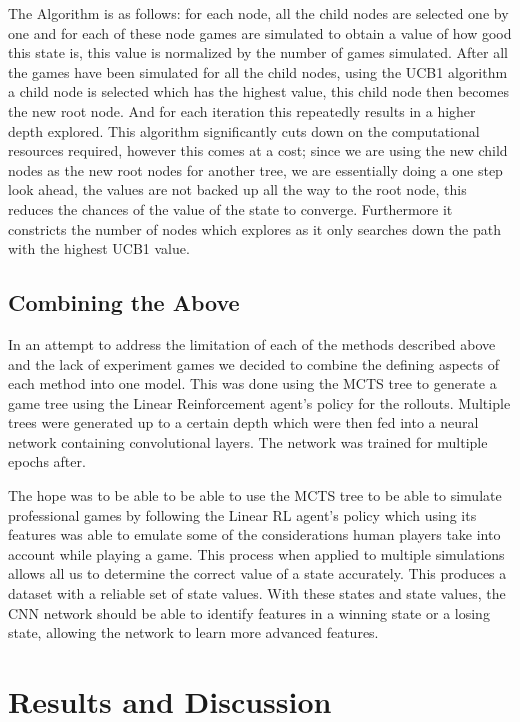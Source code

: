 \documentclass[a4paper,12pt,table]{article}
\begin{document}
The Algorithm is as follows: for each node, all the child nodes are selected one by one and for each of these node games are simulated to obtain a value of how good this state is, this value is normalized by the number of games simulated. After all the games have been simulated for all the child nodes, using the UCB1 algorithm a child node is selected which has the highest value, this child node then becomes the new root node. And for each iteration this repeatedly results in a higher depth explored. This algorithm significantly cuts down on the computational resources required, however this comes at a cost; since we are using the new child nodes as the new root nodes for another tree, we are essentially doing a one step look ahead, the values are not backed up all the way to the root node, this reduces the chances of the value of the state to converge. Furthermore it constricts the number of nodes which explores as it only searches down the path with the highest UCB1 value. \par


\subsection{Combining the Above}

In an attempt to address the limitation of each of the methods described above and the lack of experiment games we decided to combine the defining aspects of each method into one model. This was done using the MCTS tree to generate a game tree using the Linear Reinforcement agent’s policy for the rollouts. Multiple trees were generated up to a certain depth which were then fed into a neural network containing convolutional layers. The network was trained for multiple epochs after. \par

The hope was to be able to be able to use the MCTS tree to be able to simulate professional games by following the Linear RL agent’s policy which using its features was able to emulate some of the considerations human players take into account while playing a game. This process when applied to multiple simulations allows all us to determine the correct value of a state accurately. This produces a dataset with a reliable set of state values. With these states and state values, the CNN network should be able to identify features in a winning state or a losing state, allowing the network to learn more advanced features. \par

\section{Results and Discussion}
\end{document}
